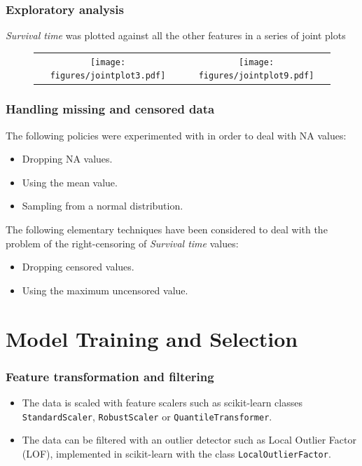 \documentclass{beamer}
\newcommand*{\sectionp}{\usebeamertemplate*{section p}}
\newcommand{\nologo}{\setbeamertemplate{logo}{}}
\begin{document}
{\nologo
\begin{frame}
\frametitle{Exploratory analysis}
\textit{Survival time} was plotted against all the other features in a series of joint plots
\begin{figure}[h]
  	\centering
  	\begin{tabular}{cc}
		\texttt{[image: figures/jointplot3.pdf]} &
  		\texttt{[image: figures/jointplot9.pdf]} \\
  	\end{tabular}
\end{figure}
\end{frame}}

\begin{frame}
\frametitle{Handling missing and censored data}
The following policies were experimented with in order to deal with NA values:
\begin{itemize}
\item Dropping NA values.
\item Using the mean value.
\item Sampling from a normal distribution.
\end{itemize}
\vspace{0.4cm}
The following elementary techniques have been considered to deal with the problem of the right-censoring of \textit{Survival time} values:
\begin{itemize}
\item Dropping censored values.
\item Using the maximum uncensored value.
\end{itemize}
\end{frame}

\section{Model Training and Selection}
\frame{\sectionp}


\begin{frame}
\frametitle{Feature transformation and filtering}
\begin{itemize}
\item The data is scaled with feature scalers such as scikit-learn classes \texttt{StandardScaler}, \texttt{RobustScaler} or \texttt{QuantileTransformer}.
\item The data can be filtered with an outlier detector such as Local Outlier Factor (LOF), implemented in scikit-learn with the class \texttt{LocalOutlierFactor}.
\end{itemize}
\end{frame}
\end{document}
